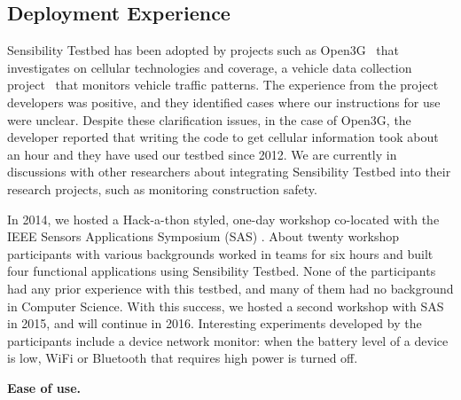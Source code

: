 
\subsection{Deployment Experience}\label{sec-deployment}



Sensibility Testbed has been adopted by projects such as 
Open3G~\cite{open3g} that investigates on cellular technologies 
and coverage, a vehicle data collection project~\cite{reininger2015first} 
that monitors vehicle traffic patterns. The experience from the 
project developers was positive, and they identified cases where our 
instructions for use were unclear. Despite these clarification issues, in 
the case of Open3G, the developer reported that writing the code to
get cellular information took about an hour and they have used our
testbed since 2012. We are currently in discussions with other 
researchers about integrating Sensibility Testbed into their research
projects, such as monitoring construction safety.

In 2014, we hosted a Hack-a-thon styled, one-day workshop co-located with 
the IEEE Sensors Applications Symposium (SAS) \cite{sas}. About twenty 
workshop participants with various backgrounds worked in teams 
for six hours and built four functional applications using Sensibility 
Testbed. None of the participants had any prior experience with 
this testbed, and many of them had no background in Computer
Science. With this success, we hosted a second workshop with 
SAS in 2015, and will continue in 2016. Interesting experiments 
developed by the participants include a device network monitor: 
when the battery level of a device is low, WiFi or Bluetooth that 
requires high power is turned off.

\textbf{Ease of use.}


